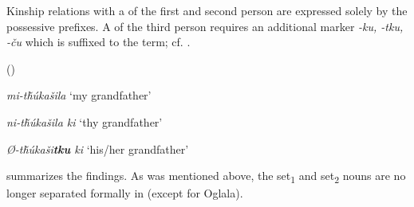 \documentclass[output=paper]{LSP/langsci}
\begin{document}
Kinship relations with a  of the first and second person are expressed solely by the possessive prefixes. A  of the third person requires an additional marker \textit{-ku, -tku, -\v{c}u} which is suffixed to the   term; cf. .
 
\ea	{} (\citealt[102]{Buechel1939}) \label{lakotamygrandfather}

\textit{mi-t\v{h}\'ukašila} \hspace{3.6em}		`my grandfather'
 
\textit{ni-t\v{h}\'ukašila ki } \hspace{2.3em}	`thy grandfather'

\textit{Ø-t\v{h}\'ukaši\textbf{tku} ki }	\hspace{1.8em} `his/her grandfather'
\z

 summarizes the findings. As was mentioned above, the set\textsubscript{1} and set\textsubscript{2}  nouns are no longer separated formally in  (except for Oglala).
\end{document}
